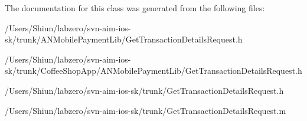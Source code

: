 The documentation for this class was generated from the following files:\begin{DoxyCompactItemize}
\item 
/Users/Shiun/labzero/svn-\/aim-\/ios-\/sk/trunk/ANMobilePaymentLib/GetTransactionDetailsRequest.h\item 
/Users/Shiun/labzero/svn-\/aim-\/ios-\/sk/trunk/CoffeeShopApp/ANMobilePaymentLib/GetTransactionDetailsRequest.h\item 
/Users/Shiun/labzero/svn-\/aim-\/ios-\/sk/trunk/GetTransactionDetailsRequest.h\item 
/Users/Shiun/labzero/svn-\/aim-\/ios-\/sk/trunk/GetTransactionDetailsRequest.m\end{DoxyCompactItemize}

